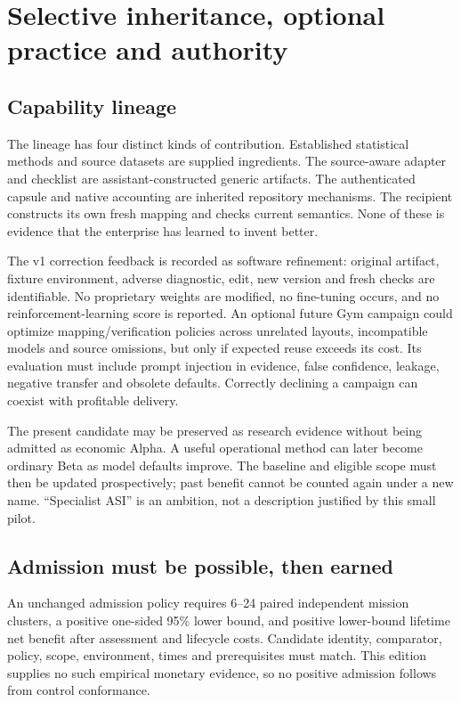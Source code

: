 \section{Selective inheritance, optional practice and authority}

\subsection{Capability lineage}

The lineage has four distinct kinds of contribution. Established statistical methods and source datasets are supplied ingredients. The source-aware adapter and checklist are assistant-constructed generic artifacts. The authenticated capsule and native accounting are inherited repository mechanisms. The recipient constructs its own fresh mapping and checks current semantics. None of these is evidence that the enterprise has learned to invent better.

The v1 correction feedback is recorded as software refinement: original artifact, fixture environment, adverse diagnostic, edit, new version and fresh checks are identifiable. No proprietary weights are modified, no fine-tuning occurs, and no reinforcement-learning score is reported. An optional future Gym campaign could optimize mapping/verification policies across unrelated layouts, incompatible models and source omissions, but only if expected reuse exceeds its cost. Its evaluation must include prompt injection in evidence, false confidence, leakage, negative transfer and obsolete defaults. Correctly declining a campaign can coexist with profitable delivery.

The present candidate may be preserved as research evidence without being admitted as economic Alpha. A useful operational method can later become ordinary Beta as model defaults improve. The baseline and eligible scope must then be updated prospectively; past benefit cannot be counted again under a new name. ``Specialist ASI'' is an ambition, not a description justified by this small pilot.

\subsection{Admission must be possible, then earned}

An unchanged admission policy requires 6–24 paired independent mission clusters, a positive one-sided 95\% lower bound, and positive lower-bound lifetime net benefit after assessment and lifecycle costs. Candidate identity, comparator, policy, scope, environment, times and prerequisites must match. This edition supplies no such empirical monetary evidence, so no positive admission follows from control conformance.

